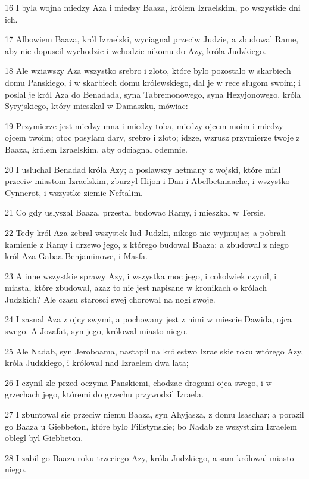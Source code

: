 \par 16 I byla wojna miedzy Aza i miedzy Baaza, królem Izraelskim, po wszystkie dni ich.
\par 17 Albowiem Baaza, król Izraelski, wyciagnal przeciw Judzie, a zbudowal Rame, aby nie dopuscil wychodzic i wchodzic nikomu do Azy, króla Judzkiego.
\par 18 Ale wziawszy Aza wszystko srebro i zloto, które bylo pozostalo w skarbiech domu Panskiego, i w skarbiech domu królewskiego, dal je w rece slugom swoim; i poslal je król Aza do Benadada, syna Tabremonowego, syna Hezyjonowego, króla Syryjskiego, który mieszkal w Damaszku, mówiac:
\par 19 Przymierze jest miedzy mna i miedzy toba, miedzy ojcem moim i miedzy ojcem twoim; otoc posylam dary, srebro i zloto; idzze, wzrusz przymierze twoje z Baaza, królem Izraelskim, aby odciagnal odemnie.
\par 20 I usluchal Benadad króla Azy; a poslawszy hetmany z wojski, które mial przeciw miastom Izraelskim, zburzyl Hijon i Dan i Abelbetmaache, i wszystko Cynnerot, i wszystke ziemie Neftalim.
\par 21 Co gdy uslyszal Baaza, przestal budowac Ramy, i mieszkal w Tersie.
\par 22 Tedy król Aza zebral wszystek lud Judzki, nikogo nie wyjmujac; a pobrali kamienie z Ramy i drzewo jego, z którego budowal Baaza: a zbudowal z niego król Aza Gabaa Benjaminowe, i Masfa.
\par 23 A inne wszystkie sprawy Azy, i wszystka moc jego, i cokolwiek czynil, i miasta, które zbudowal, azaz to nie jest napisane w kronikach o królach Judzkich? Ale czasu starosci swej chorowal na nogi swoje.
\par 24 I zasnal Aza z ojcy swymi, a pochowany jest z nimi w miescie Dawida, ojca swego. A Jozafat, syn jego, królowal miasto niego.
\par 25 Ale Nadab, syn Jeroboama, nastapil na królestwo Izraelskie roku wtórego Azy, króla Judzkiego, i królowal nad Izraelem dwa lata;
\par 26 I czynil zle przed oczyma Panskiemi, chodzac drogami ojca swego, i w grzechach jego, któremi do grzechu przywodzil Izraela.
\par 27 I zbuntowal sie przeciw niemu Baaza, syn Ahyjasza, z domu Isaschar; a porazil go Baaza u Giebbeton, które bylo Filistynskie; bo Nadab ze wszystkim Izraelem oblegl byl Giebbeton.
\par 28 I zabil go Baaza roku trzeciego Azy, króla Judzkiego, a sam królowal miasto niego.
